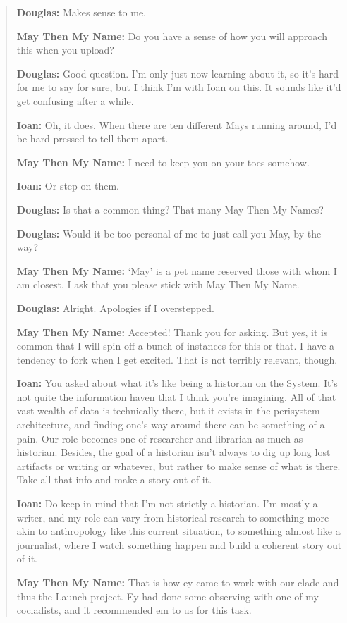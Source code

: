 \begin{quote}
\textbf{Douglas:} Makes sense to me.

\textbf{May Then My Name:} Do you have a sense of how you will approach this when you upload?

\textbf{Douglas:} Good question. I'm only just now learning about it, so it's hard for me to say for sure, but I think I'm with Ioan on this. It sounds like it'd get confusing after a while.

\textbf{Ioan:} Oh, it does. When there are ten different Mays running around, I'd be hard pressed to tell them apart.

\textbf{May Then My Name:} I need to keep you on your toes somehow.

\textbf{Ioan:} Or step on them.

\textbf{Douglas:} Is that a common thing? That many May Then My Names?

\textbf{Douglas:} Would it be too personal of me to just call you May, by the way?

\textbf{May Then My Name:} `May' is a pet name reserved those with whom I am closest. I ask that you please stick with May Then My Name.

\textbf{Douglas:} Alright. Apologies if I overstepped.

\textbf{May Then My Name:} Accepted! Thank you for asking. But yes, it is common that I will spin off a bunch of instances for this or that. I have a tendency to fork when I get excited. That is not terribly relevant, though.

\textbf{Ioan:} You asked about what it's like being a historian on the System. It's not quite the information haven that I think you're imagining. All of that vast wealth of data is technically there, but it exists in the perisystem architecture, and finding one's way around there can be something of a pain. Our role becomes one of researcher and librarian as much as historian. Besides, the goal of a historian isn't always to dig up long lost artifacts or writing or whatever, but rather to make sense of what is there. Take all that info and make a story out of it.

\textbf{Ioan:} Do keep in mind that I'm not strictly a historian. I'm mostly a writer, and my role can vary from historical research to something more akin to anthropology like this current situation, to something almost like a journalist, where I watch something happen and build a coherent story out of it.

\textbf{May Then My Name:} That is how ey came to work with our clade and thus the Launch project. Ey had done some observing with one of my cocladists, and it recommended em to us for this task.


\end{quote}
